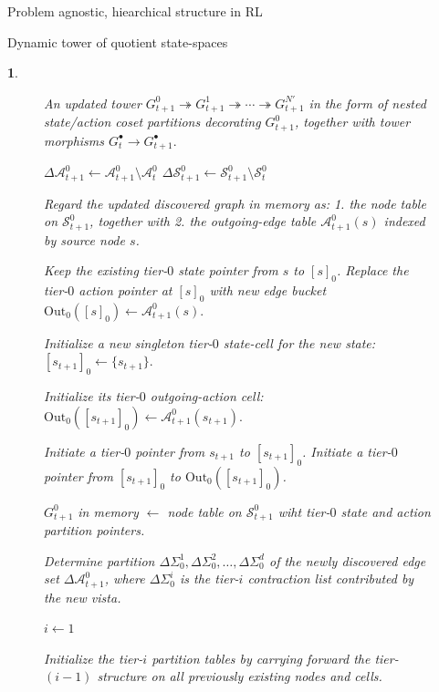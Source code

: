 \documentclass[11pt]{article}
\newtheorem{ermark}[subsubsection]{}
\begin{document}
\begin{section}{Problem agnostic, hiearchical structure in RL}
\begin{subsection}{Dynamic tower of quotient state-spaces}
\begin{ermark}
\begin{figure}[!h]
\begin{algorithm}[H]
\begin{algorithmic}[1]
\Ensure
An updated tower
$
G_{t+1}^0 \twoheadrightarrow G_{t+1}^1 \twoheadrightarrow \cdots \twoheadrightarrow G_{t+1}^{N'}
$
in the form of nested state/action coset partitions decorating $G_{t+1}^0$, together with tower morphisms
$
G_t^\bullet \longrightarrow G_{t+1}^\bullet.
$

\Statex


    \State $\Delta\mathcal{A}_{t+1}^0 \gets \mathcal{A}_{t+1}^0\setminus \mathcal{A}_t^0$
    \State $\Delta\mathcal{S}_{t+1}^0 \gets \mathcal{S}_{t+1}^0\setminus \mathcal{S}_t^0$

    \State Regard the updated discovered graph in memory as:
    1. the node table on $\mathcal{S}_{t+1}^0$, together with
    2. the outgoing-edge table $\mathcal{A}_{t+1}^0(s)$ indexed by source node $s$.


        \State Keep the existing tier-$0$ state pointer from $s$ to $[s]_0$.
        \State Replace the tier-$0$ action pointer at $[s]_0$ with new edge bucket
        $
        \mathrm{Out}_0([s]_0)\gets \mathcal{A}_{t+1}^0(s).
        $
    \EndFor

    \State Initialize a new singleton tier-$0$ state-cell for the new state:
    $
    [s_{t+1}]_0\gets \{s_{t+1}\}.
    $

    \State Initialize its tier-$0$ outgoing-action cell:
    $
    \mathrm{Out}_0([s_{t+1}]_0)\gets \mathcal{A}_{t+1}^0(s_{t+1}).
    $

    \State Initiate a tier-$0$ pointer from $s_{t+1}$ to $[s_{t+1}]_0$.
    \State Initiate a tier-$0$ pointer from $[s_{t+1}]_0$ to $\mathrm{Out}_0([s_{t+1}]_0)$.

    \State $G_{t+1}^0$ in memory $\gets$ node table on $\mathcal{S}_{t+1}^0$ wiht tier-$0$ state and action partition pointers.

    \State Determine partition
    $
    \Delta\Sigma_0^1,\Delta\Sigma_0^2,\dots,\Delta\Sigma_0^d
    $
    of the newly discovered edge set $\Delta\mathcal{A}_{t+1}^0$, where $\Delta\Sigma_0^i$ is the tier-$i$ contraction list contributed by the new vista.


    \State $i \gets 1$

        \State Initialize the tier-$i$ partition tables by carrying forward the tier-$(i-1)$ structure on all previously existing nodes and cells.


\end{algorithmic}
\end{algorithm}
\end{figure}
\end{ermark}
\end{subsection}
\end{section}
\end{document}
